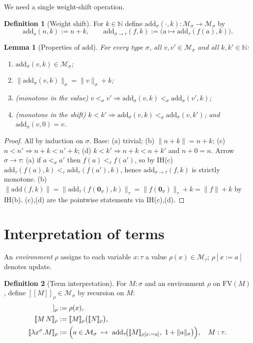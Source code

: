 \documentclass{amsart}
\newtheorem{lemma}{Lemma}
\theoremstyle{definition}
\newtheorem{definition}{Definition}
\newcommand{\interp}[1]{[\![#1]\!]}
\newcommand{\FV}{\mathrm{FV}}
\begin{document}
We need a single weight-shift operation.

\begin{definition}[Weight shift]\label{def:add}
For $k\in\mathbb N$ define $\mathrm{add}_\sigma(\cdot,k):\mathcal M_\sigma\to\mathcal M_\sigma$ by
\[
  \mathrm{add}_o(n,k):=n+k,\qquad
  \mathrm{add}_{\sigma\to\tau}(f,k):=\bigl(a\mapsto\mathrm{add}_\tau(f(a),k)\bigr).
\]
\end{definition}

\begin{lemma}[Properties of $\mathrm{add}$]\label{lem:add}
For every type $\sigma$, all $v,v'\in\mathcal M_\sigma$ and all $k,k'\in\mathbb N$:
\begin{enumerate}
\item[(a)] $\mathrm{add}_\sigma(v,k)\in\mathcal M_\sigma$;
\item[(b)] $\|\mathrm{add}_\sigma(v,k)\|_\sigma=\|v\|_\sigma+k$;
\item[(c)] \emph{(monotone in the value)} $v<_\sigma v'\Rightarrow\mathrm{add}_\sigma(v,k)<_\sigma\mathrm{add}_\sigma(v',k)$;
\item[(d)] \emph{(monotone in the shift)} $k<k'\Rightarrow\mathrm{add}_\sigma(v,k)<_\sigma\mathrm{add}_\sigma(v,k')$; and $\mathrm{add}_\sigma(v,0)=v$.
\end{enumerate}
\end{lemma}

\begin{proof}
All by induction on $\sigma$. Base: (a) trivial; (b) $\|n+k\|=n+k$; (c) $n<n'\Rightarrow n+k<n'+k$;
(d) $k<k'\Rightarrow n+k<n+k'$ and $n+0=n$. Arrow $\sigma\to\tau$: (a) if $a<_\sigma a'$ then
$f(a)<_\tau f(a')$, so by IH(c) $\mathrm{add}_\tau(f(a),k)<_\tau\mathrm{add}_\tau(f(a'),k)$, hence
$\mathrm{add}_{\sigma\to\tau}(f,k)$ is strictly monotone. (b)
$\|\mathrm{add}(f,k)\|=\|\mathrm{add}_\tau(f(\mathbf 0_\sigma),k)\|_\tau=\|f(\mathbf 0_\sigma)\|_\tau+k=\|f\|+k$
by IH(b). (c),(d) are the pointwise statements via IH(c),(d).
\end{proof}

\section{Interpretation of terms}

An \emph{environment} $\rho$ assigns to each variable $x:\tau$ a value
$\rho(x)\in\mathcal M_\tau$; $\rho[x:=a]$ denotes update.

\begin{definition}[Term interpretation]\label{def:interp}
For $M:\sigma$ and an environment $\rho$ on $\FV(M)$, define $\interp{M}_\rho\in\mathcal M_\sigma$
by recursion on $M$:
\begin{align*}
  \interp{x}_\rho &:= \rho(x),\\
  \interp{M\,N}_\rho &:= \interp{M}_\rho\bigl(\interp{N}_\rho\bigr),\\
  \interp{\lambda x^\sigma.M}_\rho &:=
     \Bigl(a\in\mathcal M_\sigma\ \mapsto\
       \mathrm{add}_\tau\!\bigl(\interp{M}_{\rho[x:=a]},\ 1+\|a\|_\sigma\bigr)\Bigr),
     \quad M:\tau .
\end{align*}
\end{definition}
\end{document}

